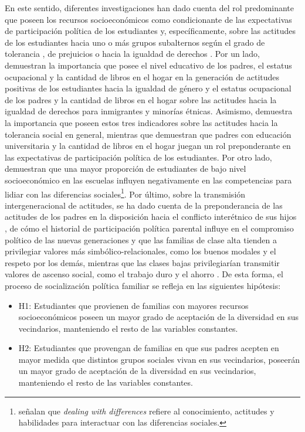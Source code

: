 \documentclass[12pt,twoside]{templates/facsothesis}
\begin{document}
En este sentido, diferentes investigaciones han dado cuenta del rol predominante que poseen los recursos socioeconómicos como condicionante de las expectativas de participación política de los estudiantes \citep{castillo_Social_2014} y, específicamente, sobre las actitudes de los estudiantes hacia uno o más grupos subalternos según el grado de tolerancia \citep{farkac_Tolerance_2020}, de prejuicios \citep{weber_educational_2020} o hacia la igualdad de derechos \citep{isac_Native_2012, miranda_Political_2018}. Por un lado, \citet{miranda_Political_2018} demuestran la importancia que posee el nivel educativo de los padres, el estatus ocupacional y la cantidad de libros en el hogar en la generación de actitudes positivas de los estudiantes hacia la igualdad de género y el estatus ocupacional de los padres y la cantidad de libros en el hogar sobre las actitudes hacia la igualdad de derechos para inmigrantes y minorías étnicas. Asimismo, \citet{ortiz_Actitudes_2016} demuestra la importancia que poseen estos tres indicadores sobre las actitudes hacia la tolerancia social en general, mientras que \citet{castillo_Social_2014} demuestran que padres con educación universitaria y la cantidad de libros en el hogar juegan un rol preponderante en las expectativas de participación política de los estudiantes. Por otro lado, \citet{sincer_relationship_2020} demuestran que una mayor proporción de estudiantes de bajo nivel socioeconómico en las escuelas influyen negativamente en las competencias para lidiar con las diferencias sociales\footnote{\citet{sincer_relationship_2020} señalan que \emph{dealing with differences} refiere al conocimiento, actitudes y habilidades para interactuar con las diferencias sociales.}. Por último, sobre la transmisión intergeneracional de actitudes, se ha dado cuenta de la preponderancia de las actitudes de los padres en la disposición hacia el conflicto interétnico de sus hijos \citep{medjedovic_intergroup_2021}, de cómo el historial de participación política parental influye en el compromiso político de las nuevas generaciones \citep{bacovsky_raising_2021} y que las familias de clase alta tienden a privilegiar valores más simbólico-relacionales, como los buenos modales y el respeto por los demás, mientras que las clases bajas privilegiarían transmitir valores de ascenso social, como el trabajo duro y el ahorro \citep{santanderramirez_preferencias_2020}. De esta forma, el proceso de socialización política familiar se refleja en las siguientes hipótesis:

\begin{itemize}
\item
  H1: Estudiantes que provienen de familias con mayores recursos socioeconómicos poseen un mayor grado de aceptación de la diversidad en sus vecindarios, manteniendo el resto de las variables constantes.
\item
  H2: Estudiantes que provengan de familias en que sus padres acepten en mayor medida que distintos grupos sociales vivan en sus vecindarios, poseerán un mayor grado de aceptación de la diversidad en sus vecindarios, manteniendo el resto de las variables constantes.
\end{itemize}
\end{document}
